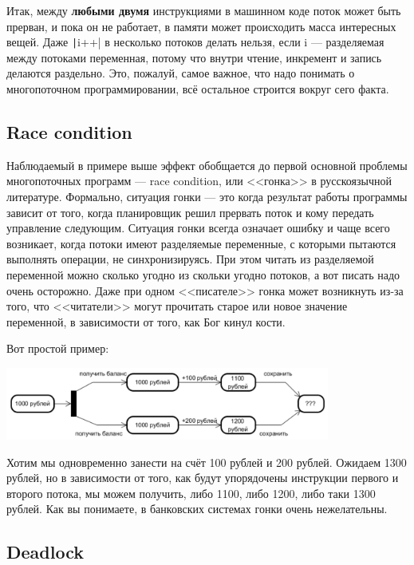 \documentclass{../../text-style}
\begin{document}
Итак, между \textbf{любыми двумя} инструкциями в машинном коде поток может быть прерван, и пока он не работает, в памяти может происходить масса интересных вещей. Даже \texttt|i++| в несколько потоков делать нельзя, если i --- разделяемая между потоками переменная, потому что внутри чтение, инкремент и запись делаются раздельно. Это, пожалуй, самое важное, что надо понимать о многопоточном программировании, всё остальное строится вокруг сего факта.

\subsection{Race condition}

Наблюдаемый в примере выше эффект обобщается до первой основной проблемы многопоточных программ --- race condition, или <<гонка>> в русскоязычной литературе. Формально, ситуация гонки --- это когда результат работы программы зависит от того, когда планировщик решил прервать поток и кому передать управление следующим. Ситуация гонки всегда означает ошибку и чаще всего возникает, когда потоки имеют разделяемые переменные, с которыми пытаются выполнять операции, не синхронизируясь. При этом читать из разделяемой переменной можно сколько угодно из скольки угодно потоков, а вот писать надо очень осторожно. Даже при одном <<писателе>> гонка может возникнуть из-за того, что <<читатели>> могут прочитать старое или новое значение переменной, в зависимости от того, как Бог кинул кости.

Вот простой пример:

\begin{center}
    \includegraphics[width=0.8\textwidth]{raceCondition.png}
\end{center}

Хотим мы одновременно занести на счёт 100 рублей и 200 рублей. Ожидаем 1300 рублей, но в зависимости от того, как будут упорядочены инструкции первого и второго потока, мы можем получить, либо 1100, либо 1200, либо таки 1300 рублей. Как вы понимаете, в банковских системах гонки очень нежелательны.

\subsection{Deadlock}
\end{document}
